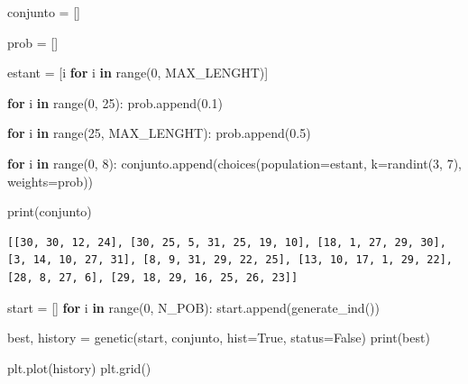 \documentclass[
]{article}
\newenvironment{Shaded}{}{}
\newcommand{\BuiltInTok}[1]{#1}
\newcommand{\ControlFlowTok}[1]{\textcolor[rgb]{0.00,0.44,0.13}{\textbf{#1}}}
\newcommand{\DecValTok}[1]{\textcolor[rgb]{0.25,0.63,0.44}{#1}}
\newcommand{\FloatTok}[1]{\textcolor[rgb]{0.25,0.63,0.44}{#1}}
\newcommand{\KeywordTok}[1]{\textcolor[rgb]{0.00,0.44,0.13}{\textbf{#1}}}
\newcommand{\NormalTok}[1]{#1}
\newcommand{\OperatorTok}[1]{\textcolor[rgb]{0.40,0.40,0.40}{#1}}
\newcommand{\VariableTok}[1]{\textcolor[rgb]{0.10,0.09,0.49}{#1}}
\begin{document}
\begin{Shaded}
\begin{Highlighting}[]
\NormalTok{conjunto }\OperatorTok{=}\NormalTok{ []}

\NormalTok{prob }\OperatorTok{=}\NormalTok{ []}

\NormalTok{estant }\OperatorTok{=}\NormalTok{ [i }\ControlFlowTok{for}\NormalTok{ i }\KeywordTok{in} \BuiltInTok{range}\NormalTok{(}\DecValTok{0}\NormalTok{, MAX_LENGHT)]}

\ControlFlowTok{for}\NormalTok{ i }\KeywordTok{in} \BuiltInTok{range}\NormalTok{(}\DecValTok{0}\NormalTok{, }\DecValTok{25}\NormalTok{):}
\NormalTok{    prob.append(}\FloatTok{0.1}\NormalTok{)}

\ControlFlowTok{for}\NormalTok{ i }\KeywordTok{in} \BuiltInTok{range}\NormalTok{(}\DecValTok{25}\NormalTok{, MAX_LENGHT):}
\NormalTok{    prob.append(}\FloatTok{0.5}\NormalTok{)}

\ControlFlowTok{for}\NormalTok{ i }\KeywordTok{in} \BuiltInTok{range}\NormalTok{(}\DecValTok{0}\NormalTok{, }\DecValTok{8}\NormalTok{):}
\NormalTok{    conjunto.append(choices(population}\OperatorTok{=}\NormalTok{estant, k}\OperatorTok{=}\NormalTok{randint(}\DecValTok{3}\NormalTok{, }\DecValTok{7}\NormalTok{), weights}\OperatorTok{=}\NormalTok{prob))}

\BuiltInTok{print}\NormalTok{(conjunto)}
\end{Highlighting}
\end{Shaded}

\begin{verbatim}
[[30, 30, 12, 24], [30, 25, 5, 31, 25, 19, 10], [18, 1, 27, 29, 30], [3, 14, 10, 27, 31], [8, 9, 31, 29, 22, 25], [13, 10, 17, 1, 29, 22], [28, 8, 27, 6], [29, 18, 29, 16, 25, 26, 23]]
\end{verbatim}

\begin{Shaded}
\begin{Highlighting}[]
\NormalTok{start }\OperatorTok{=}\NormalTok{ []}
\ControlFlowTok{for}\NormalTok{ i }\KeywordTok{in} \BuiltInTok{range}\NormalTok{(}\DecValTok{0}\NormalTok{, N_POB):}
\NormalTok{    start.append(generate_ind())}

\NormalTok{best, history }\OperatorTok{=}\NormalTok{ genetic(start, conjunto, hist}\OperatorTok{=}\VariableTok{True}\NormalTok{, status}\OperatorTok{=}\VariableTok{False}\NormalTok{)}
\BuiltInTok{print}\NormalTok{(best)}

\NormalTok{plt.plot(history)}
\NormalTok{plt.grid()}
\end{Highlighting}
\end{Shaded}
\end{document}
